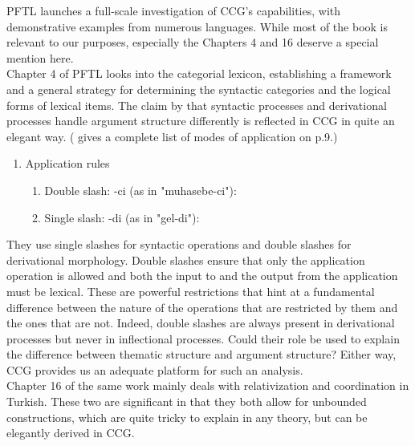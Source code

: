 \documentclass[11pt]{article} %
\begin{document}
PFTL launches a full-scale investigation of CCG's capabilities, with demonstrative examples from numerous languages. While most of the book is relevant to our purposes, especially the Chapters 4 and 16 deserve a special mention here. \\ 

Chapter 4 of PFTL looks into the categorial lexicon, establishing a framework and a general strategy for determining the syntactic categories and the logical forms of lexical items. The claim by \citet{Sezer1991} that syntactic processes and derivational processes handle argument structure differently is reflected in CCG in quite an elegant way. (\citet{SteedmanBaldridge2011} gives a complete list of modes of application on p.9.)

\begin{enumerate}[label=(\arabic*), leftmargin=1cm]
	\item Application rules
	\begin{enumerate}[label=(\alph*), ref=(\alph*)]\itemsep1pt
	\item Double slash: -ci (as in "muhasebe-ci"): 
	\item Single slash: -di (as in "gel-di"): 
	\end{enumerate}
\end{enumerate}

They use single slashes for syntactic operations and double slashes for derivational morphology. Double slashes ensure that only the application operation is allowed and both the input to and the output from the application must be lexical. These are powerful restrictions that hint at a fundamental difference between the nature of the operations that are restricted by them and the ones that are not. Indeed, double slashes are always present in derivational processes but never in inflectional processes. Could their role be used to explain the difference between thematic structure and argument structure? Either way, CCG provides us an adequate platform for such an analysis. \\

Chapter 16 of the same work mainly deals with relativization and coordination in Turkish. These two are significant in that they both allow for unbounded constructions, which are quite tricky to explain in any theory, but can be elegantly derived in CCG. \\ 
\end{document}
